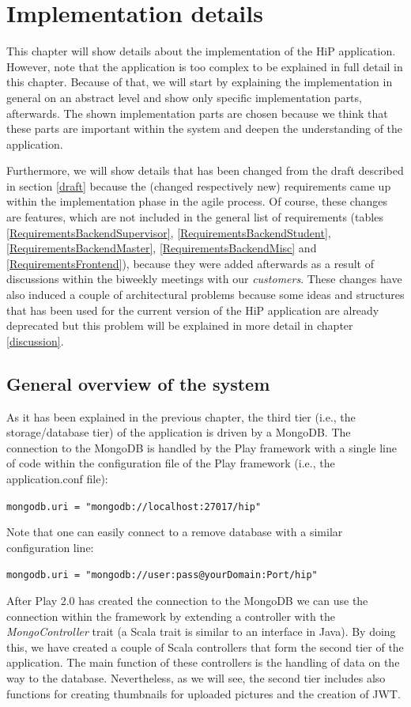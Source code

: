 \chapter[Implementation details]{Implementation details}
\label{implementation}
This chapter will show details about the implementation of the \ac{HiP} application. However, note that the application is too complex to be explained in full detail in this chapter. Because of that, we will start by explaining the implementation in general on an abstract level and show only specific implementation parts, afterwards. The shown implementation parts are chosen because we think that these parts are important within the system and deepen the understanding of the application.

Furthermore, we will show details that has been changed from the draft described in section \ref{draft} because the (changed respectively new) requirements came up within the implementation phase in the agile process. Of course, these changes are features, which are not included in the general list of requirements (tables \ref{RequirementsBackendSupervisor}, \ref{RequirementsBackendStudent}, \ref{RequirementsBackendMaster}, \ref{RequirementsBackendMisc} and \ref{RequirementsFrontend}), because they were added afterwards as a result of discussions within the biweekly meetings with our \emph{customers}. These changes have also induced a couple of architectural problems because some ideas and structures that has been used for the current version of the \ac{HiP} application are already deprecated but this problem will be explained in more detail in chapter \ref{discussion}.

\section{General overview of the system}
As it has been explained in the previous chapter, the third tier (i.e., the storage/database tier) of the application is driven by a MongoDB. The connection to the MongoDB is handled by the Play framework with a single line of code within the configuration file of the Play framework (i.e., the application.conf file):

\verb|mongodb.uri = "mongodb://localhost:27017/hip"|

Note that one can easily connect to a remove database with a similar configuration line:

\verb|mongodb.uri = "mongodb://user:pass@yourDomain:Port/hip"|  

After Play 2.0 has created the connection to the MongoDB we can use the connection within the framework by extending a controller with the \emph{MongoController} trait (a Scala trait is similar to an interface in Java). By doing this, we have created a couple of Scala controllers that form the second tier of the application. The main function of these controllers is the handling of data on the way to the database. Nevertheless, as we will see, the second tier includes also functions for creating thumbnails for uploaded pictures and the creation of \ac{JWT}. 

